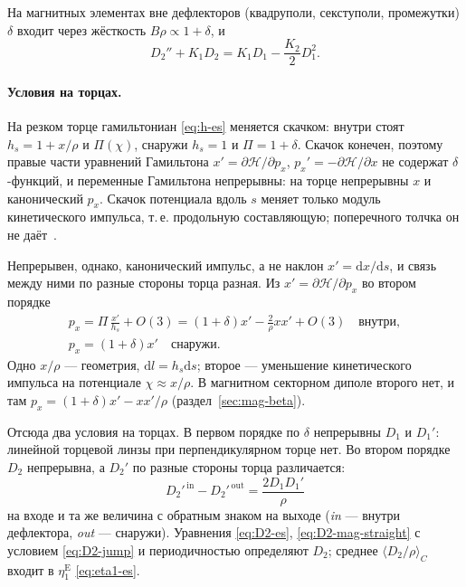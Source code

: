 На магнитных элементах вне дефлекторов (квадруполи, секступоли, промежутки) $\delta$ входит через жёсткость $B\rho\propto1+\delta$, и
\begin{equation}
\label{eq:D2-mag-straight}
D_2''+K_1D_2=K_1D_1-\frac{K_2}{2}D_1^2.
\end{equation}

\paragraph{Условия на торцах.}
На резком торце гамильтониан \eqref{eq:h-es} меняется скачком: внутри стоят $h_s=1+x/\rho$ и $\Pi(\chi)$, снаружи $h_s=1$ и $\Pi=1+\delta$. Скачок конечен, поэтому правые части уравнений Гамильтона $x'=\partial\mathcal{H}/\partial p_x$, $p_x'=-\partial\mathcal{H}/\partial x$ не содержат $\delta$-функций, и переменные Гамильтона непрерывны: на торце непрерывны $x$ и канонический $p_x$. Скачок потенциала вдоль $s$ меняет только модуль кинетического импульса, т.\,е. продольную составляющую; поперечного толчка он не даёт~\cite{Wollnik1965,ValetovBerz2020}.

Непрерывен, однако, канонический импульс, а не наклон $x'=\mathrm{d}x/\mathrm{d}s$, и связь между ними по разные стороны торца разная. Из $x'=\partial\mathcal{H}/\partial p_x$ во втором порядке
\begin{equation*}
\begin{gathered}
p_x=\Pi\,\frac{x'}{h_s}+O(3)
=(1+\delta)x'-\frac{2}{\rho}xx'+O(3)\quad\text{внутри},
\\
p_x=(1+\delta)x'\quad\text{снаружи}.
\end{gathered}
\end{equation*}
Одно $x/\rho$ --- геометрия, $\mathrm{d}l=h_s\mathrm{d}s$; второе --- уменьшение кинетического импульса на потенциале $\chi\approx x/\rho$. В магнитном секторном диполе второго нет, и там $p_x=(1+\delta)x'-xx'/\rho$ (раздел~\ref{sec:mag-beta}).

Отсюда два условия на торцах. В первом порядке по $\delta$ непрерывны $D_1$ и $D_1'$: линейной торцевой линзы при перпендикулярном торце нет. Во втором порядке $D_2$ непрерывна, а $D_2'$ по разные стороны торца различается:
\begin{equation}
\label{eq:D2-jump}
D_2'^{\,\mathrm{in}}-D_2'^{\,\mathrm{out}}=\frac{2D_1D_1'}{\rho}
\end{equation}
на входе и та же величина с обратным знаком на выходе (\textit{in} --- внутри дефлектора, \textit{out} --- снаружи). Уравнения \eqref{eq:D2-es}, \eqref{eq:D2-mag-straight} с условием \eqref{eq:D2-jump} и периодичностью определяют $D_2$; среднее $\langle D_2/\rho\rangle_C$ входит в $\eta_1^{\mathrm{E}}$ \eqref{eq:eta1-es}.

